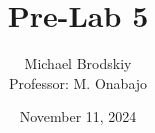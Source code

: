 


\title{Pre-Lab 5}
\date{November 11, 2024}
\author{Michael Brodskiy\\ \small Professor: M. Onabajo}



\maketitle

